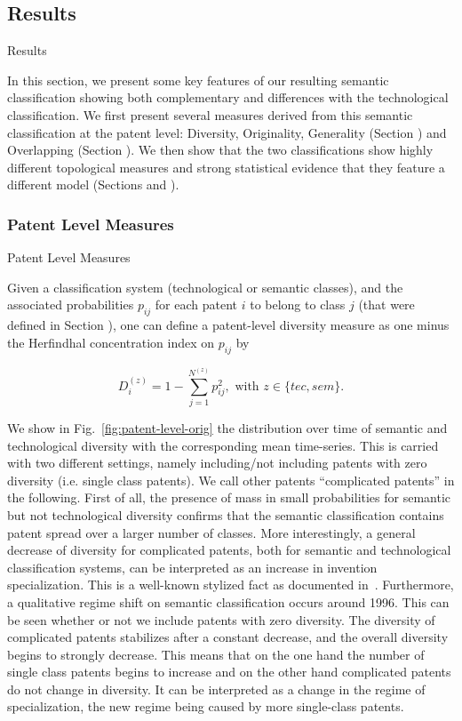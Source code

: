 \subsection*{Results \label{result}}{Results}

In this section, we present some key features of our resulting semantic classification showing both complementary and differences with the technological classification. We first present several measures derived from this semantic classification at the patent level: Diversity, Originality, Generality (Section ) and Overlapping (Section ). We then show that the two classifications show highly
different topological measures and strong statistical evidence that they feature a different model (Sections  and ).


\subsubsection*{Patent Level Measures}{Patent Level Measures}  \label{subsec:orig-gene}

Given a classification system (technological or semantic classes), and the associated probabilities $p_{ij}$ for each patent $i$ to belong to class $j$ (that were defined in Section ), one can define a patent-level diversity measure as one minus the Herfindhal concentration index on $p_{ij}$  by

\[
D_i^{(z)} = 1 - \sum_{j =1}^{N^{(z)}} {p_{ij}^2}, \text{ with } z \in \{tec, sem\}.
\]

We show in Fig.~\ref{fig:patent-level-orig} the distribution over time of semantic and technological diversity with the corresponding mean time-series. This is carried with two different settings, namely including/not including patents with zero diversity (i.e. single class patents). We call other patents ``complicated patents'' in the following. First of all, the presence of mass in small probabilities for semantic but not technological diversity confirms that the semantic classification contains patent spread over a larger number of classes. More interestingly, a general decrease of diversity for complicated patents, both for semantic and technological classification systems, can be interpreted as an increase in invention specialization. This is a well-known stylized fact as documented in~\cite{ARCHIBUGI199279}. Furthermore, a qualitative regime shift on semantic classification occurs around 1996. This can be seen whether or not we include patents with zero diversity. The diversity of complicated patents stabilizes after a constant decrease, and the overall diversity begins to strongly decrease. This means that on the one hand the number of single class patents begins to increase and on the other hand complicated patents do not change in diversity. It can be interpreted as a change in the regime of specialization, the new regime being caused by more single-class patents.

